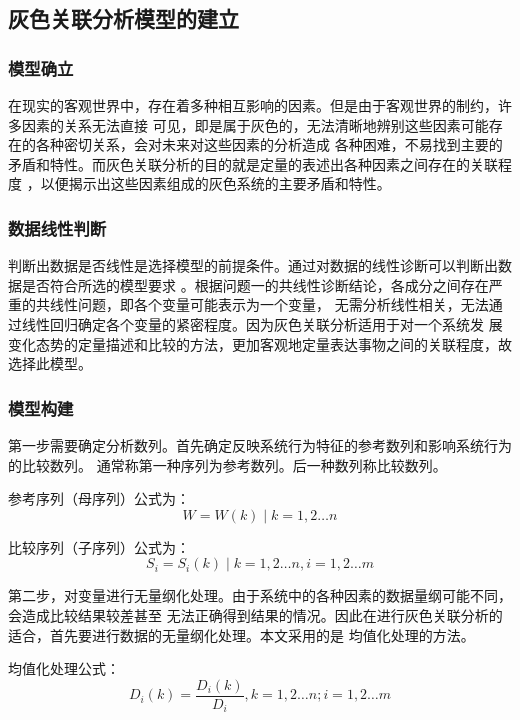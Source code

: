 \documentclass[UTF8]{ctexart}
\begin{document}
\subsection{灰色关联分析模型的建立}
\subsubsection{模型确立}
在现实的客观世界中，存在着多种相互影响的因素。但是由于客观世界的制约，许多因素的关系无法直接
可见，即是属于灰色的，无法清晰地辨别这些因素可能存在的各种密切关系，会对未来对这些因素的分析造成
各种困难，不易找到主要的矛盾和特性。而灰色关联分析的目的就是定量的表述出各种因素之间存在的关联程度
，以便揭示出这些因素组成的灰色系统的主要矛盾和特性。

\subsubsection{数据线性判断}
判断出数据是否线性是选择模型的前提条件。通过对数据的线性诊断可以判断出数据是否符合所选的模型要求
。根据问题一的共线性诊断结论，各成分之间存在严重的共线性问题，即各个变量可能表示为一个变量，
无需分析线性相关，无法通过线性回归确定各个变量的紧密程度。因为灰色关联分析适用于对一个系统发
展变化态势的定量描述和比较的方法，更加客观地定量表达事物之间的关联程度，故选择此模型。

\subsubsection{模型构建}
第一步需要确定分析数列。首先确定反映系统行为特征的参考数列和影响系统行为的比较数列。
通常称第一种序列为参考数列。后一种数列称比较数列。

参考序列（母序列）公式为：
\begin{equation}
    W=W(k) \mid k=1,2\dots n
\end{equation}

比较序列（子序列）公式为：
\begin{equation}
    S_{i}=S_{i}(k) \mid k=1,2 \ldots n,i=1,2 \ldots m
\end{equation}

第二步，对变量进行无量纲化处理。由于系统中的各种因素的数据量纲可能不同，会造成比较结果较差甚至
无法正确得到结果的情况。因此在进行灰色关联分析的适合，首先要进行数据的无量纲化处理。本文采用的是
均值化处理的方法。

均值化处理公式：
\begin{equation}
    D_{i}(k)=\frac{D_{i}(k)}{D_{i}}, k=1,2 \ldots n;i=1,2 \ldots m
\end{equation}
\end{document}

